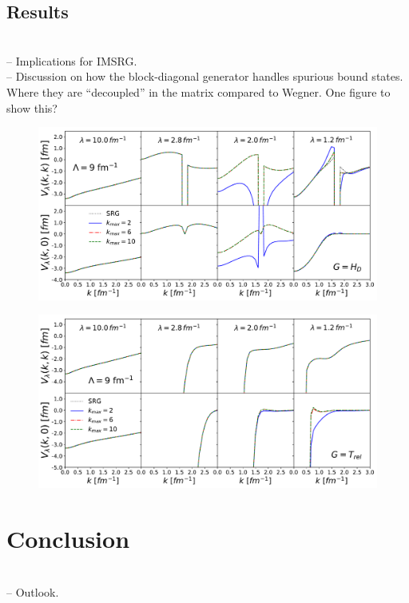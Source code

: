 \documentclass[preprintnumbers,floatfix,aps,prc,preprint,nofootinbib]{revtex4-1}
\begin{document}
\subsection{Results}
\label{sec:magnus_expansion_results}


\\
-- Implications for IMSRG.
\\
-- Discussion on how the block-diagonal generator handles spurious bound states. Where they are ``decoupled'' in the matrix compared to Wegner. One figure to show this?
%
\begin{figure}[H]
	\centering
	\includegraphics[clip,width=0.9\columnwidth]{Magnus/potential_diagonals_offdiags_kvnn901_Wegner}%
	\label{fig:potential_slices_high_cutoffs_Wegner}
\end{figure}
%
\begin{figure}[H]
	\centering
	\includegraphics[clip,width=0.9\columnwidth]{Magnus/potential_diagonals_offdiags_kvnn901_T}%
	\label{fig:potential_slices_high_cutoffs_T}
\end{figure}
%


\section{Conclusion}
\label{sec:conclusion}


\\
-- Outlook.





\end{document}
